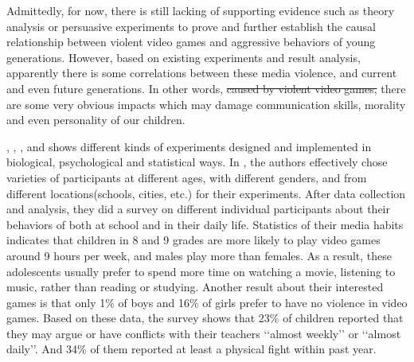 \indent\indent Admittedly, for now, there is still lacking of supporting evidence such as theory analysis or persuasive experiments to prove and further establish the causal relationship between violent video games and aggressive behaviors of young generations. However, based on existing experiments and result analysis, apparently there is  some correlations between  these media violence, and current and even future generations. In other words, \sout{caused by violent video games,} there are some very obvious impacts which may damage communication skills, morality and even personality of our children.

 \cite{barlett2009}, \cite{ferguson2008}, \cite{gentile2004}, and \cite{anderson2003} shows different kinds of experiments designed and implemented in biological, psychological and statistical ways. In \cite{gentile2004}, the authors effectively chose varieties of participants at different ages, with different genders, and from different locations(schools, cities, etc.) for their experiments. After data collection and analysis, they did a survey on different individual participants about their behaviors of both at school and in their daily life. Statistics of their media habits indicates that children in 8 and 9 grades are more likely to play video games around 9 hours per week, and males play more than females. As a result, these adolescents usually prefer to spend more time on watching a movie, listening to music, rather than reading or studying. Another result about their interested games is that only 1\% of boys and 16\% of girls prefer to have no violence in video games. Based on these data, the survey shows that 23\% of children reported that they may argue or have conflicts with their teachers ‘‘almost weekly’’ or ‘‘almost daily’’. And 34\% of them reported at least a physical fight within past year. 
 
